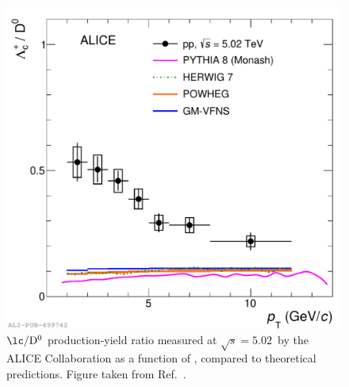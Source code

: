 \begin{figure}[htb]
  \centering
  \includegraphics[width=0.7\linewidth]{Figures/Chapter 2/LcD_models_withFFModels_ropes_2.pdf}
  \caption{$\mathrm{\lc/D^0}$ production-yield ratio measured at $\sqrt{s} = 5.02$~\tev by the ALICE Collaboration as a function of \pt, compared to theoretical predictions. Figure taken from Ref.~\cite{ALICE:2020wla}.}
  \label{fig:Lambda_c_D0_ee}
\end{figure}


